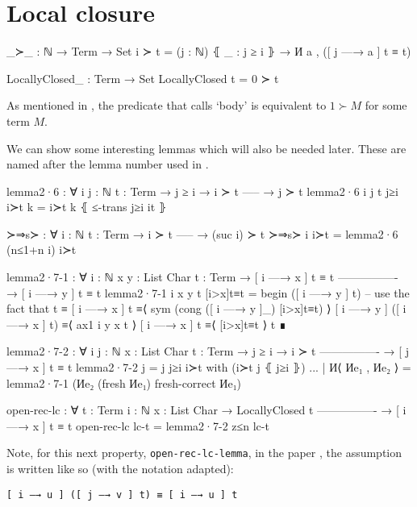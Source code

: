 \section{Local closure}
\label{appendix:local_closure_proofs}
\begin{code}
  _≻_ : ℕ → Term → Set
  i ≻ t = (j : ℕ) ⦃ _ : j ≥ i ⦄ → И a , ([ j —→ a ] t ≡ t)

  LocallyClosed_ : Term → Set
  LocallyClosed t = 0 ≻ t
\end{code}

As mentioned in \citet{pitts_locally_2023}, the predicate that \citet{chargueraud_locally_2012}
calls `body' is equivalent to $1 \succ M$ for some term $M$.

We can show some interesting lemmas which will also be needed later. These are named after the lemma
number used in \citet{pitts_locally_2023}.
\begin{code}
  lemma2·6 : ∀ {i j : ℕ} {t : Term}
    → j ≥ i
    → i ≻ t
      -----
    → j ≻ t
  lemma2·6 {i} {j} {t} j≥i i≻t k = i≻t k ⦃ ≤-trans j≥i it ⦄

  ≻⇒s≻ : ∀ {i : ℕ} {t : Term}
    → i ≻ t
      -----
    → (suc i) ≻ t
  ≻⇒s≻ {i} i≻t = lemma2·6 (n≤1+n i) i≻t

  lemma2·7-1 : ∀ {i : ℕ} {x y : List Char} {t : Term}
    → [ i —→ x ] t ≡ t
      ----------------
    → [ i —→ y ] t ≡ t
  lemma2·7-1 {i} {x} {y} {t} [i>x]t≡t =
    begin
      ([ i —→ y ] t)
    -- use the fact that t ≡ [ i —→ x ] t
    ≡⟨ sym (cong ([ i —→ y ]_) [i>x]t≡t) ⟩
      [ i —→ y ] ([ i —→ x ] t)
    ≡⟨ ax1 i y x t ⟩
      [ i —→ x ] t
    ≡⟨ [i>x]t≡t ⟩
      t
    ∎

  lemma2·7-2 : ∀ {i j : ℕ} {x : List Char} {t : Term}
    → j ≥ i
    → i ≻ t
      ----------------
    → [ j —→ x ] t ≡ t
  lemma2·7-2 {j = j} j≥i i≻t with (i≻t j ⦃ j≥i ⦄)
  ... | И⟨ Иe₁ , Иe₂ ⟩ =
    lemma2·7-1 (Иe₂ (fresh Иe₁) {fresh-correct Иe₁})

  open-rec-lc : ∀ {t : Term} {i : ℕ} {x : List Char}
    → LocallyClosed t
      ----------------
    → [ i —→ x ] t ≡ t
  open-rec-lc lc-t = lemma2·7-2 z≤n lc-t
\end{code}

Note, for this next property, \texttt{open-rec-lc-lemma}, in the paper
\citep{chargueraud_locally_2012}, the assumption is written like so (with the notation adapted):

\texttt{[ i —→ u ] ([ j —→ v ] t) ≡ [ i —→ u ] t}

